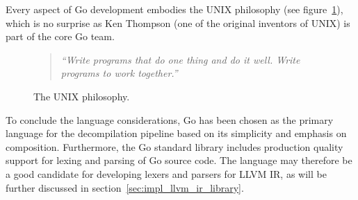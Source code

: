 Every aspect of Go development embodies the UNIX philosophy (see figure~\ref{fig:unix_philosophy}), which is no surprise as Ken Thompson (one of the original inventors of UNIX) is part of the core Go team.

\begin{figure}[htbp]
	\begin{center}
		\begin{quote}
			\textit{``Write programs that do one thing and do it well. Write programs to work together.''}~\cite{art_of_unix}
		\end{quote}
		\caption{The UNIX philosophy.}
		\label{fig:unix_philosophy}
	\end{center}
\end{figure}

To conclude the language considerations, Go has been chosen as the primary language for the decompilation pipeline based on its simplicity and emphasis on composition. Furthermore, the Go standard library includes production quality support for lexing and parsing of Go source code. The language may therefore be a good candidate for developing lexers and parsers for LLVM IR, as will be further discussed in section~\ref{sec:impl_llvm_ir_library}.
